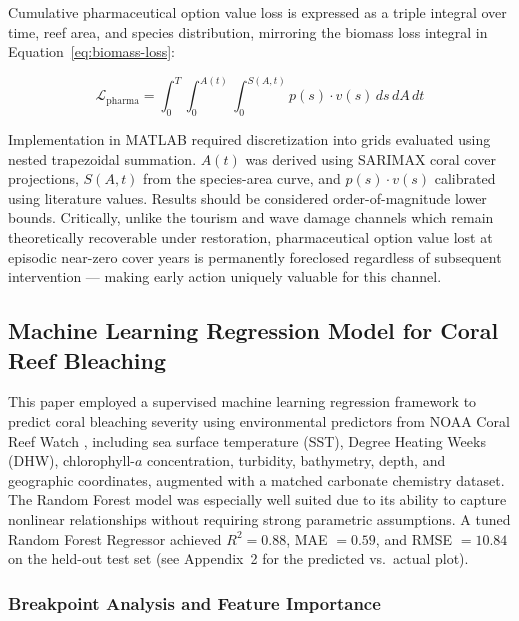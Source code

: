 \documentclass[10pt,letterpaper]{article}
\begin{document}
Cumulative pharmaceutical option value loss is expressed as a triple integral over time, reef area, and species distribution, mirroring the biomass loss integral in Equation~\ref{eq:biomass-loss}:

\begin{equation}
\mathcal{L}_{\text{pharma}} = \int_0^T \int_0^{A(t)} \int_0^{S(A,t)} p(s) \cdot v(s) \, ds \, dA \, dt
\end{equation}

Implementation in MATLAB required discretization into grids evaluated using nested trapezoidal summation. $A(t)$ was derived using SARIMAX coral cover projections, $S(A,t)$ from the species-area curve, and $p(s) \cdot v(s)$ calibrated using literature values. Results should be considered order-of-magnitude lower bounds. Critically, unlike the tourism and wave damage channels which remain theoretically recoverable under restoration, pharmaceutical option value lost at episodic near-zero cover years is permanently foreclosed regardless of subsequent intervention --- making early action uniquely valuable for this channel.

\subsection{Machine Learning Regression Model for Coral Reef Bleaching}

This paper employed a supervised machine learning regression framework to predict coral bleaching severity using environmental predictors from NOAA Coral Reef Watch \cite{noaa_crw}, including sea surface temperature (SST), Degree Heating Weeks (DHW), chlorophyll-$a$ concentration, turbidity, bathymetry, depth, and geographic coordinates, augmented with a matched carbonate chemistry dataset. The Random Forest model was especially well suited due to its ability to capture nonlinear relationships without requiring strong parametric assumptions. A tuned Random Forest Regressor achieved $R^2 = 0.88$, MAE $= 0.59$, and RMSE $= 10.84$ on the held-out test set (see Appendix~2 for the predicted vs.\ actual plot).

\subsubsection{Breakpoint Analysis and Feature Importance}
\end{document}
